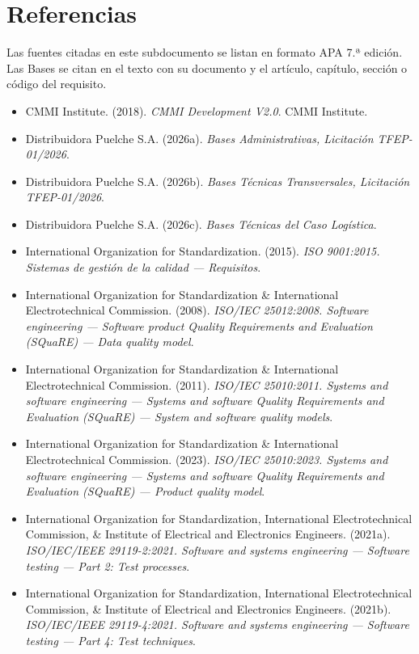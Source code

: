 \section*{Referencias}

Las fuentes citadas en este subdocumento se listan en formato APA 7.ª edición. Las Bases se citan en el texto con su documento y el artículo, capítulo, sección o código del requisito.

\begin{itemize}[before=\raggedright,itemsep=0pt,parsep=0pt,topsep=2pt]
  \item CMMI Institute. (2018). \emph{CMMI Development V2.0}. CMMI Institute.
  \item Distribuidora Puelche S.A. (2026a). \emph{Bases Administrativas, Licitación TFEP-01/2026}.
  \item Distribuidora Puelche S.A. (2026b). \emph{Bases Técnicas Transversales, Licitación TFEP-01/2026}.
  \item Distribuidora Puelche S.A. (2026c). \emph{Bases Técnicas del Caso Logística}.
  \item International Organization for Standardization. (2015). \emph{ISO 9001:2015. Sistemas de gestión de la calidad — Requisitos}.
  \item International Organization for Standardization \& International Electrotechnical Commission. (2008). \emph{ISO/IEC 25012:2008. Software engineering — Software product Quality Requirements and Evaluation (SQuaRE) — Data quality model}.
  \item International Organization for Standardization \& International Electrotechnical Commission. (2011). \emph{ISO/IEC 25010:2011. Systems and software engineering — Systems and software Quality Requirements and Evaluation (SQuaRE) — System and software quality models}.
  \item International Organization for Standardization \& International Electrotechnical Commission. (2023). \emph{ISO/IEC 25010:2023. Systems and software engineering — Systems and software Quality Requirements and Evaluation (SQuaRE) — Product quality model}.
  \item International Organization for Standardization, International Electrotechnical Commission, \& Institute of Electrical and Electronics Engineers. (2021a). \emph{ISO/IEC/IEEE 29119-2:2021. Software and systems engineering — Software testing — Part 2: Test processes}.
  \item International Organization for Standardization, International Electrotechnical Commission, \& Institute of Electrical and Electronics Engineers. (2021b). \emph{ISO/IEC/IEEE 29119-4:2021. Software and systems engineering — Software testing — Part 4: Test techniques}.

\end{itemize}
